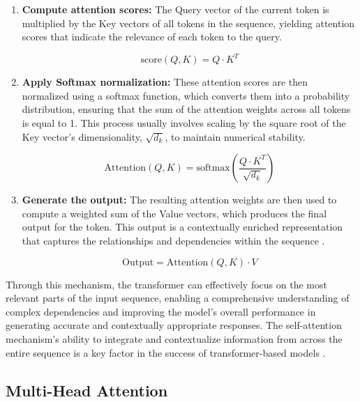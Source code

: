 \begin{enumerate}
    \item \textbf{Compute attention scores:} The Query vector of the current token is multiplied by the Key vectors of all tokens in the sequence, yielding attention scores that indicate the relevance of each token to the query.

    \begin{equation}
        \text{score}(Q, K) = Q \cdot K^T
    \end{equation}
    
    \item \textbf{Apply Softmax normalization:} These attention scores are then normalized using a softmax function, which converts them into a probability distribution, ensuring that the sum of the attention weights across all tokens is equal to 1. This process usually involves scaling by the square root of the Key vector's dimensionality, \( \sqrt{d_k} \), to maintain numerical stability.

    \begin{equation}
        \text{Attention}(Q, K) = \text{softmax}\left(\frac{Q \cdot K^T}{\sqrt{d_k}} \right)
    \end{equation}
    
    \item \textbf{Generate the output:} The resulting attention weights are then used to compute a weighted sum of the Value vectors, which produces the final output for the token. This output is a contextually enriched representation that captures the relationships and dependencies within the sequence \cite{vaswani2017attention}.

    \begin{equation}
        \text{Output} = \text{Attention}(Q, K) \cdot V
    \end{equation}
\end{enumerate}

Through this mechanism, the transformer can effectively focus on the most relevant parts of the input sequence, enabling a comprehensive understanding of complex dependencies and improving the model's overall performance in generating accurate and contextually appropriate responses. The self-attention mechanism's ability to integrate and contextualize information from across the entire sequence is a key factor in the success of transformer-based models \cite{geeksforgeeks2024-sa}.

\subsection{Multi-Head Attention}

